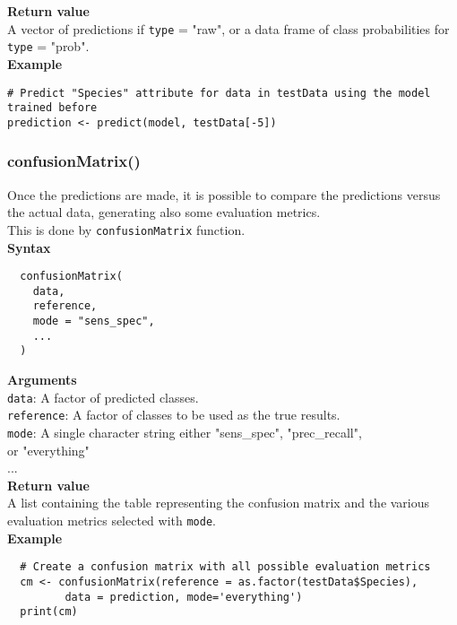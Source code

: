 \documentclass{article}
\begin{document}
\textbf{Return value}\\

A vector of predictions if \texttt{type} = "raw", or a data frame of class probabilities for \texttt{type} = "prob".\\

\textbf{Example}\\
\begin{lstlisting}
# Predict "Species" attribute for data in testData using the model trained before
prediction <- predict(model, testData[-5])
\end{lstlisting}

\pagebreak

\subsubsection{confusionMatrix()}
Once the predictions are made, it is possible to compare the predictions versus the actual data, generating also some evaluation metrics.\\
This is done by \texttt{confusionMatrix} function.\\

\textbf{Syntax}
\begin{verbatim}
  confusionMatrix(
    data,
    reference,
    mode = "sens_spec",
    ...
  )
\end{verbatim}

\textbf{Arguments}\\

\texttt{data}: A factor of predicted classes.\\
\texttt{reference}: A factor of classes to be used as the true results.\\
\texttt{mode}: A single character string either "sens\_spec", "prec\_recall",\\
\phantom{..........}or "everything"\\
...\\

\textbf{Return value}\\

A list containing the table representing the confusion matrix and the various evaluation metrics selected with \texttt{mode}.\\

\textbf{Example}\\

\begin{lstlisting}
  # Create a confusion matrix with all possible evaluation metrics
  cm <- confusionMatrix(reference = as.factor(testData$Species), 
         data = prediction, mode='everything')
  print(cm)
\end{lstlisting}
\end{document}
